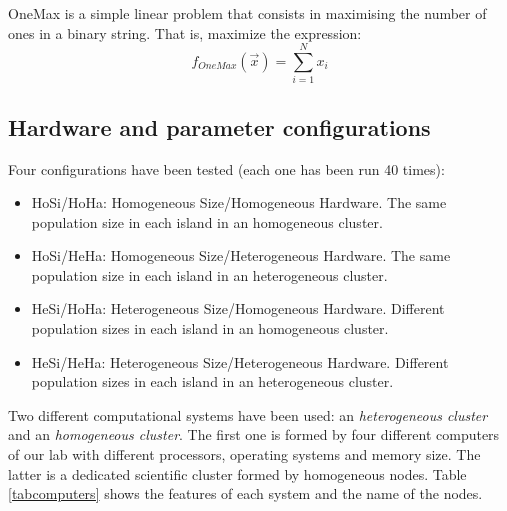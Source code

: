 \documentclass[final,1p,times]{elsarticle}
\begin{document}
OneMax is a simple linear problem that consists in maximising the number of ones in a binary string. That is, maximize the expression:
\begin{equation}
f_{OneMax}(\vec{x}) = \sum_{i=1}^{N}{x_{i}}
\end{equation}

\subsection{Hardware and parameter configurations}

Four configurations have been tested (each one has been run 40 times):

\begin{itemize}
\item HoSi/HoHa: Homogeneous Size/Homogeneous Hardware. The same population size in each island in an homogeneous cluster.
\item HoSi/HeHa: Homogeneous Size/Heterogeneous Hardware. The same population size in each island in an heterogeneous cluster.
\item HeSi/HoHa: Heterogeneous Size/Homogeneous Hardware. Different population sizes in each island in an homogeneous cluster.
\item HeSi/HeHa: Heterogeneous Size/Heterogeneous Hardware. Different population sizes in each island in an heterogeneous cluster.
\end{itemize}

Two different computational systems have been used: an {\em heterogeneous cluster} and an {\em homogeneous cluster}. The first one is formed by four different computers of our lab with different processors, operating systems and memory size. The latter is a dedicated scientific cluster formed by homogeneous nodes. Table \ref{tabcomputers} shows the features of each system and the name of the nodes.
\end{document}
